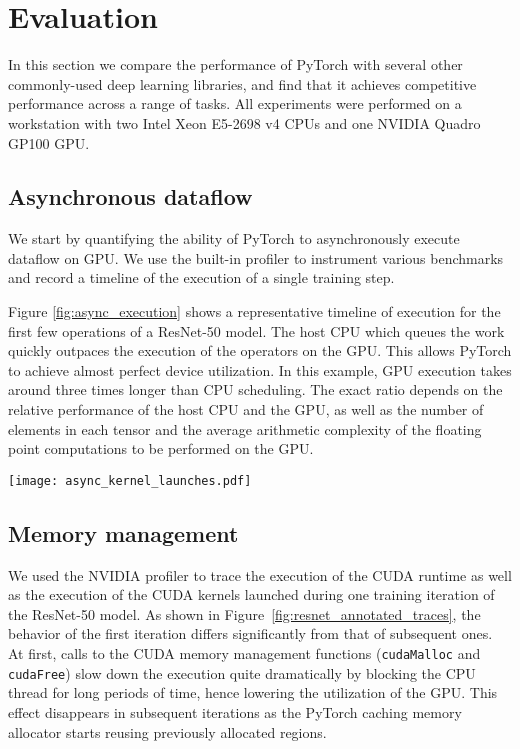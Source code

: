 \section{Evaluation}   \label{evaluation}


In this section we compare the performance of PyTorch with several other commonly-used deep learning libraries, and find that it achieves competitive performance across a range of tasks. All experiments were performed on a workstation with two Intel Xeon E5-2698 v4 CPUs and one NVIDIA Quadro GP100 GPU.

\subsection{Asynchronous dataflow}
We start by quantifying the ability of PyTorch to asynchronously execute dataflow on GPU. We use the built-in profiler \cite{autograd_profiler} to instrument various benchmarks and record a timeline of the execution of a single training step.

Figure \ref{fig:async_execution} shows a representative timeline of execution for the first few operations of a ResNet-50 model. The host CPU which queues the work quickly outpaces the execution of the operators on the GPU. This allows PyTorch to achieve almost perfect device utilization. In this example, GPU execution takes around three times longer than CPU scheduling. The exact ratio depends on the relative performance of the host CPU and the GPU, as well as the number of elements in each tensor and the average arithmetic complexity of the floating point computations to be performed on the GPU.

\begin{center}
  \texttt{[image: async\_kernel\_launches.pdf]}
\end{center}


\subsection{Memory management}
We used the NVIDIA profiler to trace the execution of the CUDA runtime as well as the execution of the CUDA kernels launched during one training iteration of the ResNet-50 model. As shown in Figure~\ref{fig:resnet_annotated_traces}, the behavior of the first iteration differs significantly from that of subsequent ones. At first, calls to the CUDA memory management functions (\verb|cudaMalloc| and \verb|cudaFree|) slow down the execution quite dramatically by blocking the CPU thread for long periods of time, hence lowering the utilization of the GPU. This effect disappears in subsequent iterations as the PyTorch caching memory allocator starts reusing previously allocated regions.

